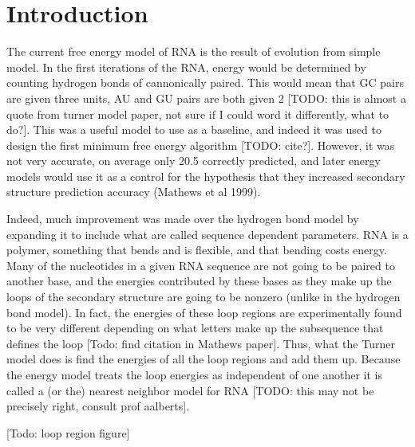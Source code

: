 \chapter{Introduction}

The current free energy model of RNA is the result of evolution from
simple model. In the first iterations of the RNA, energy would be
determined by counting hydrogen bonds of cannonically paired. This
would mean that GC pairs are given three units, AU and GU pairs are
both given 2 [TODO: this is almost a quote from turner model paper,
not sure if I could word it differently, what to do?]. This was a
useful model to use as a baseline, and indeed it was used to design
the first minimum free energy algorithm [TODO: cite?]. However, it was
not very accurate, on average only 20.5%
correctly predicted, and later energy models would use it as a control
for the hypothesis that they increased secondary structure prediction
accuracy (Mathews et al 1999).

Indeed, much improvement was made over the hydrogen bond model by
expanding it to include what are called sequence dependent
parameters. RNA is a polymer, something that bends and is flexible,
and that bending costs energy. Many of the nucleotides in a given RNA
sequence are not going to be paired to another base, and the energies
contributed by these bases as they make up the loops of the secondary
structure are going to be nonzero (unlike in the hydrogen bond
model). In fact, the energies of these loop regions are experimentally
found to be very different depending on what letters make up the
subsequence that defines the loop [Todo: find citation in Mathews
paper]. Thus, what the Turner model does is find the energies of all
the loop regions and add them up. Because the energy model treats the
loop energies as independent of one another it is called a (or the)
nearest neighbor model for RNA [TODO: this may not be precisely right,
consult prof aalberts].

[Todo: loop region figure]

